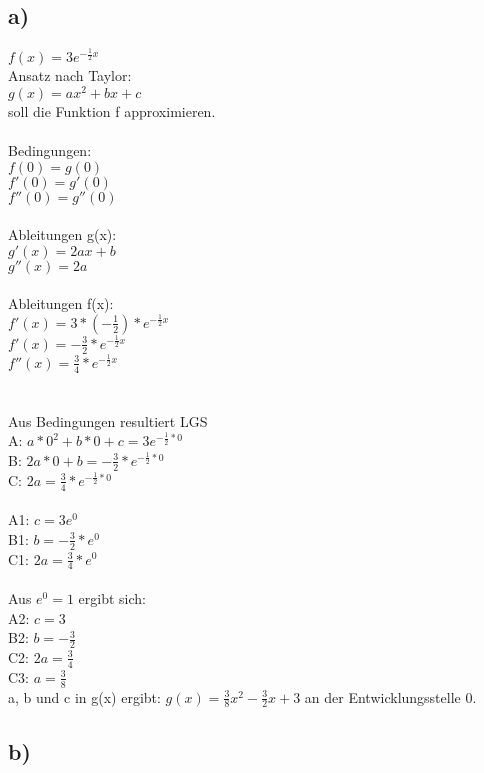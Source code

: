 \documentclass{article}
\begin{document}
	\subsection*{a)}
	$f(x) = 3e^{-\frac{1}{2}x}$ \\
	Ansatz nach Taylor: \\
	$g(x) = ax^2 + bx + c$ \\ 
	soll die Funktion f approximieren. \\ \\
	Bedingungen: \\
	$f(0) = g(0)$ \\
	$f'(0) = g'(0)$ \\
	$f''(0) = g''(0)$ \\
	\\
	Ableitungen g(x): \\
	$g'(x) = 2ax + b$ \\
	$g''(x) = 2a$ \\ \\
	Ableitungen f(x): \\
	$f'(x) = 3 * (-\frac{1}{2})*e^{-\frac{1}{2}x}$ \\
	$f'(x) = -\frac{3}{2}*e^{-\frac{1}{2}x}$ \\
	$f''(x) = \frac{3}{4}*e^{-\frac{1}{2}x}$ \\ \\ \\
	Aus Bedingungen resultiert LGS \\
	A: $a*0^2 + b*0 + c = 3e^{-\frac{1}{2}*0}$ \\
	B: $ 2a*0 + b = -\frac{3}{2}*e^{-\frac{1}{2}*0}$ \\
	C: $ 2a = \frac{3}{4}*e^{-\frac{1}{2}*0}$ \\ \\
	A1: $c = 3e^{0}$ \\
	B1: $b = -\frac{3}{2}*e^{0}$ \\
	C1: $2a = \frac{3}{4}*e^{0}$ \\ \\
	Aus $e^0 = 1$ ergibt sich:\\
	A2: $c = 3$ \\
	B2: $b = -\frac{3}{2}$ \\
	C2: $2a = \frac{3}{4}$ \\
	C3: $a = \frac{3}{8}$ \\
	a, b und c in g(x) ergibt:
	$g(x) = \frac{3}{8}x^2 - \frac{3}{2}x + 3$ an der Entwicklungsstelle 0.
	\subsection*{b)}
\end{document}
